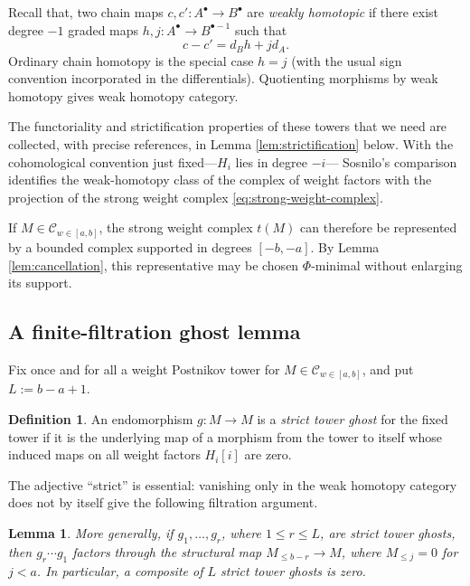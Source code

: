 \documentclass[11pt]{amsart}
\numberwithin{equation}{section}
\newtheorem{lemma}[theorem]{Lemma}
\theoremstyle{definition}
\newtheorem{definition}[theorem]{Definition}
\theoremstyle{remark}
\newcommand{\C}{\mathcal C}
\begin{document}
Recall that, two chain maps $c,c'\colon A^\bullet\to B^\bullet$ are
\emph{weakly homotopic} if there exist degree $-1$ graded maps
$h,j\colon A^\bullet\to B^{\bullet-1}$ such that
\[
  c-c'=d_Bh+jd_A.
\]
Ordinary chain homotopy is the special case $h=j$ (with the usual sign
convention incorporated in the differentials).  Quotienting morphisms by
weak homotopy gives weak homotopy category.

The functoriality and strictification properties of these towers that we need
are collected, with precise references, in Lemma  \ref{lem:strictification} below.
With the cohomological convention just fixed---$H_i$ lies in degree $-i$---
Sosnilo's comparison identifies the weak-homotopy class of the complex of
weight factors with the projection of the strong weight complex
\eqref{eq:strong-weight-complex}.

If $M\in\C_{w\in[a,b]}$, the strong weight complex $t(M)$ can therefore be
represented by a bounded complex supported in degrees $[-b,-a]$.  By Lemma 
\ref{lem:cancellation}, this representative may be chosen
$\Phi$-minimal without enlarging its support.

\subsection{A finite-filtration ghost lemma}

Fix once and for all a weight Postnikov tower for
$M\in\C_{w\in[a,b]}$, and put $L:=b-a+1.$

\begin{definition}\label{def:strict-tower-ghost}
An endomorphism $g\colon M\to M$ is a \emph{strict tower ghost} for the fixed
tower if it is the underlying map of a morphism from the tower to itself
whose induced maps on all weight factors $H_i[i]$ are zero.
\end{definition}

The adjective ``strict'' is essential: vanishing only in the weak homotopy
category does not by itself give the following filtration argument.

\begin{lemma}
\label{lem:strict-ghost}
More generally, if $g_1,\ldots,g_r$, where $1\le r\le L$, are strict tower
ghosts, then $g_r\cdots g_1$ factors through the structural map
$M_{\le b-r}\to M$, where $M_{\le j}=0$ for $j<a$.  In particular, a
composite of $L$ strict tower ghosts is zero.
\end{lemma}
\end{document}
